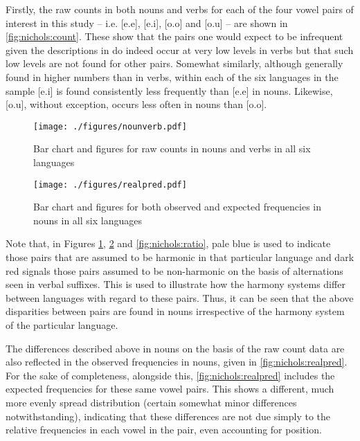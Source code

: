 \documentclass[output=paper]{langscibook}
\begin{document}
Firstly, the raw counts in both nouns and verbs for each of the four vowel pairs of interest in this study -- i.e. [e.e], [e.i], [o.o] and [o.u] -- are shown in \autoref{fig:nichols:count}. These show that the pairs one would expect to be infrequent given the descriptions in  do indeed occur at very low levels in verbs but that such low levels are not found for other pairs. Somewhat similarly, although generally found in higher numbers than in verbs, within each of the six languages in the sample [e.i] is found consistently less frequently than [e.e] in nouns. Likewise, [o.u], without exception, occurs less often in nouns than [o.o].

\begin{figure}[p]
\caption{Bar chart and figures for raw counts in nouns and verbs in all six languages}
\label{fig:nichols:count}
\texttt{[image: ./figures/nounverb.pdf]}
\end{figure}

\begin{figure}[p]
\caption{Bar chart and figures for both observed and expected frequencies in nouns in all six languages}
\label{fig:nichols:realpred}
\texttt{[image: ./figures/realpred.pdf]}
\end{figure}

Note that, in Figures \ref{fig:nichols:count}, \ref{fig:nichols:realpred} and \ref{fig:nichols:ratio}, pale blue is used to indicate those pairs that are assumed to be harmonic in that particular language and dark red signals those pairs assumed to be non-harmonic on the basis of alternations seen in verbal suffixes. This is used to illustrate how the harmony systems differ between languages with regard to these pairs. Thus, it can be seen that the above disparities between pairs are found in nouns irrespective of the harmony system of the particular language.

The differences described above in nouns on the basis of the raw count data are also reflected in the observed frequencies in nouns, given in \autoref{fig:nichols:realpred}. For the sake of completeness, alongside this, \autoref{fig:nichols:realpred} includes the expected frequencies for these same vowel pairs. This shows a different, much more evenly spread distribution (certain somewhat minor differences notwithstanding), indicating that these differences are not due simply to the relative frequencies in each vowel in the pair, even accounting for position.
\end{document}
